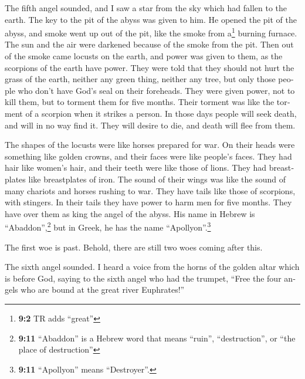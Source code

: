 \begin{paracol}{2}
\begin{otherlanguage}{english}
 The fifth angel sounded, and I saw a star from the sky
which had fallen to the earth. The key to the pit of the abyss was given
to him.  He opened the pit of the abyss, and smoke went up
out of the pit, like the smoke from a\footnote{\textbf{9:2} TR adds
  ``great''} burning furnace. The sun and the air were darkened because
of the smoke from the pit.  Then out of the smoke came
locusts on the earth, and power was given to them, as the scorpions of
the earth have power.  They were told that they should not
hurt the grass of the earth, neither any green thing, neither any tree,
but only those people who don't have God's seal on their foreheads.
 They were given power, not to kill them, but to torment
them for five months. Their torment was like the torment of a scorpion
when it strikes a person.  In those days people will seek
death, and will in no way find it. They will desire to die, and death
will flee from them.

 The shapes of the locusts were like horses prepared for
war. On their heads were something like golden crowns, and their faces
were like people's faces.  They had hair like women's
hair, and their teeth were like those of lions.  They had
breastplates like breastplates of iron. The sound of their wings was
like the sound of many chariots and horses rushing to war.
 They have tails like those of scorpions, with stingers.
In their tails they have power to harm men for five months.
 They have over them as king the angel of the abyss. His
name in Hebrew is ``Abaddon'',\footnote{\textbf{9:11} ``Abaddon'' is a
  Hebrew word that means ``ruin'', ``destruction'', or ``the place of
  destruction''} but in Greek, he has the name ``Apollyon''.\footnote{\textbf{9:11}
  ``Apollyon'' means ``Destroyer''.}

 The first woe is past. Behold, there are still two woes
coming after this.

 The sixth angel sounded. I heard a voice from the horns
of the golden altar which is before God,  saying to the
sixth angel who had the trumpet, ``Free the four angels who are bound at
the great river Euphrates!''


\end{otherlanguage}
\end{paracol}
